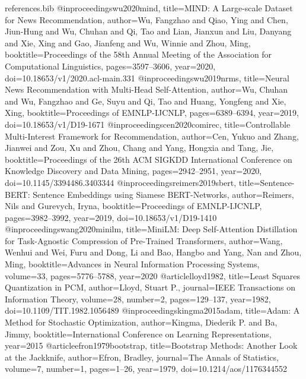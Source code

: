 \begin{filecontents*}{references.bib}
@inproceedings{wu2020mind,
  title={MIND: A Large-scale Dataset for News Recommendation},
  author={Wu, Fangzhao and Qiao, Ying and Chen, Jiun-Hung and Wu, Chuhan and Qi, Tao and Lian, Jianxun and Liu, Danyang and Xie, Xing and Gao, Jianfeng and Wu, Winnie and Zhou, Ming},
  booktitle={Proceedings of the 58th Annual Meeting of the Association for Computational Linguistics},
  pages={3597--3606}, year={2020}, doi={10.18653/v1/2020.acl-main.331}}
@inproceedings{wu2019nrms,
  title={Neural News Recommendation with Multi-Head Self-Attention},
  author={Wu, Chuhan and Wu, Fangzhao and Ge, Suyu and Qi, Tao and Huang, Yongfeng and Xie, Xing},
  booktitle={Proceedings of EMNLP-IJCNLP}, pages={6389--6394}, year={2019},
  doi={10.18653/v1/D19-1671}}
@inproceedings{cen2020comirec,
  title={Controllable Multi-Interest Framework for Recommendation},
  author={Cen, Yukuo and Zhang, Jianwei and Zou, Xu and Zhou, Chang and Yang, Hongxia and Tang, Jie},
  booktitle={Proceedings of the 26th ACM SIGKDD International Conference on Knowledge Discovery and Data Mining},
  pages={2942--2951}, year={2020}, doi={10.1145/3394486.3403344}}
@inproceedings{reimers2019sbert,
  title={Sentence-BERT: Sentence Embeddings using Siamese BERT-Networks},
  author={Reimers, Nils and Gurevych, Iryna}, booktitle={Proceedings of EMNLP-IJCNLP},
  pages={3982--3992}, year={2019}, doi={10.18653/v1/D19-1410}}
@inproceedings{wang2020minilm,
  title={MiniLM: Deep Self-Attention Distillation for Task-Agnostic Compression of Pre-Trained Transformers},
  author={Wang, Wenhui and Wei, Furu and Dong, Li and Bao, Hangbo and Yang, Nan and Zhou, Ming},
  booktitle={Advances in Neural Information Processing Systems}, volume={33},
  pages={5776--5788}, year={2020}}
@article{lloyd1982,
  title={Least Squares Quantization in PCM}, author={Lloyd, Stuart P.},
  journal={IEEE Transactions on Information Theory}, volume={28}, number={2},
  pages={129--137}, year={1982}, doi={10.1109/TIT.1982.1056489}}
@inproceedings{kingma2015adam,
  title={Adam: A Method for Stochastic Optimization},
  author={Kingma, Diederik P. and Ba, Jimmy},
  booktitle={International Conference on Learning Representations}, year={2015}}
@article{efron1979bootstrap,
  title={Bootstrap Methods: Another Look at the Jackknife}, author={Efron, Bradley},
  journal={The Annals of Statistics}, volume={7}, number={1},
  pages={1--26}, year={1979}, doi={10.1214/aos/1176344552}}
\end{filecontents*}

